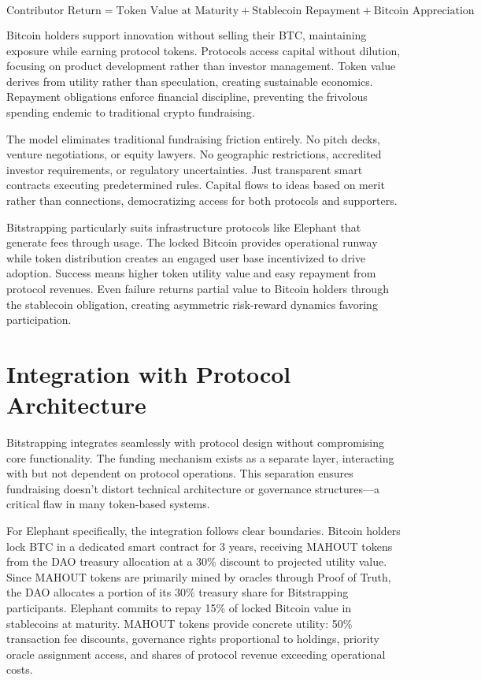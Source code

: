 \[
\text{Contributor Return} = \text{Token Value at Maturity} + \text{Stablecoin Repayment} + \text{Bitcoin Appreciation}
\]

Bitcoin holders support innovation without selling their BTC, maintaining exposure while earning protocol tokens. Protocols access capital without dilution, focusing on product development rather than investor management. Token value derives from utility rather than speculation, creating sustainable economics. Repayment obligations enforce financial discipline, preventing the frivolous spending endemic to traditional crypto fundraising.

The model eliminates traditional fundraising friction entirely. No pitch decks, venture negotiations, or equity lawyers. No geographic restrictions, accredited investor requirements, or regulatory uncertainties. Just transparent smart contracts executing predetermined rules. Capital flows to ideas based on merit rather than connections, democratizing access for both protocols and supporters.

Bitstrapping particularly suits infrastructure protocols like Elephant that generate fees through usage. The locked Bitcoin provides operational runway while token distribution creates an engaged user base incentivized to drive adoption. Success means higher token utility value and easy repayment from protocol revenues. Even failure returns partial value to Bitcoin holders through the stablecoin obligation, creating asymmetric risk-reward dynamics favoring participation.

\section{Integration with Protocol Architecture}

Bitstrapping integrates seamlessly with protocol design without compromising core functionality. The funding mechanism exists as a separate layer, interacting with but not dependent on protocol operations. This separation ensures fundraising doesn't distort technical architecture or governance structures—a critical flaw in many token-based systems.

For Elephant specifically, the integration follows clear boundaries. Bitcoin holders lock BTC in a dedicated smart contract for 3 years, receiving MAHOUT tokens from the DAO treasury allocation at a 30\% discount to projected utility value. Since MAHOUT tokens are primarily mined by oracles through Proof of Truth, the DAO allocates a portion of its 30\% treasury share for Bitstrapping participants. Elephant commits to repay 15\% of locked Bitcoin value in stablecoins at maturity. MAHOUT tokens provide concrete utility: 50\% transaction fee discounts, governance rights proportional to holdings, priority oracle assignment access, and shares of protocol revenue exceeding operational costs.

